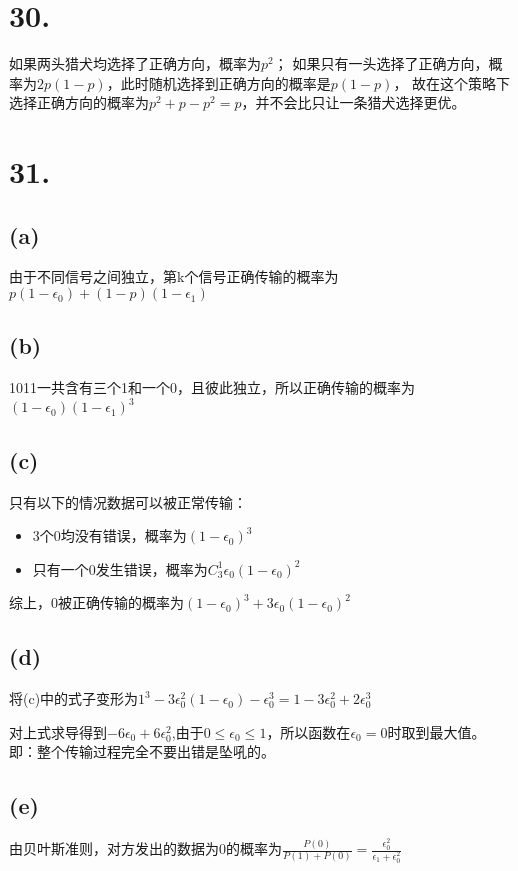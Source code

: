 \documentclass[UTF8]{report}
\begin{document}
    \section*{30.}
        如果两头猎犬均选择了正确方向，概率为$p^2$；
        如果只有一头选择了正确方向，概率为$2p(1 - p)$，此时随机选择到正确方向的概率是$p(1 - p)$，
        故在这个策略下选择正确方向的概率为$p^2 + p - p^2 = p$，并不会比只让一条猎犬选择更优。
    \section*{31.}
        \subsection*{(a)}
            由于不同信号之间独立，第k个信号正确传输的概率为$p(1 - \epsilon_0) + (1 - p)(1 - \epsilon_1)$
        \subsection*{(b)}
            1011一共含有三个1和一个0，且彼此独立，所以正确传输的概率为$(1 - \epsilon_0)(1 - \epsilon_1)^3$
        \subsection*{(c)}
            只有以下的情况数据可以被正常传输：

            \begin{itemize}
                \item 3个0均没有错误，概率为$(1 - \epsilon_0)^3$
                \item 只有一个0发生错误，概率为$C^1_3\epsilon_0(1 - \epsilon_0)^2$
            \end{itemize}

            综上，0被正确传输的概率为$(1 - \epsilon_0)^3 + 3\epsilon_0(1 - \epsilon_0)^2$
        \subsection*{(d)}
            将(c)中的式子变形为$1^3 - 3\epsilon_0^2(1 - \epsilon_0) - \epsilon_0^3 = 1 - 3\epsilon_0^2 + 2\epsilon_0^3$

            对上式求导得到$-6\epsilon_0 + 6\epsilon_0^2$,由于$0 \leq \epsilon_0 \leq 1$，所以函数在$\epsilon_0 = 0$时取到最大值。
            即：整个传输过程完全不要出错是坠吼的。
        \subsection*{(e)}
            由贝叶斯准则，对方发出的数据为0的概率为$\frac{P(0)}{P(1) + P(0)} = \frac{\epsilon_0^2}{\epsilon_1 + \epsilon_0^2}$
\end{document}
